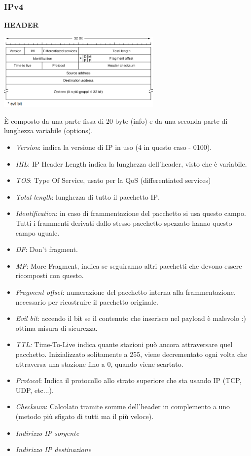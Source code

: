 \documentclass[10pt,a4paper,twoside]{article}
\begin{document}
\subsubsection{IPv4}
\textbf{HEADER}
\begin{center}
\includegraphics[width=0.6\textwidth]{images/header_ipv4.png}
\end{center}
È composto da una parte fissa di 20 byte (info) e da una seconda parte di lunghezza variabile (options).
\begin{itemize}
\item \textit{Version}: indica la versione di IP in uso (4 in questo caso - 0100).
\item \textit{IHL}: IP Header Length indica la lunghezza dell'header, visto che è variabile.
\item \textit{TOS}: Type Of Service, usato per la QoS (differentiated services)
\item \textit{Total length}: lunghezza di tutto il pacchetto IP.
\item \textit{Identification}: in caso di frammentazione del pacchetto si usa questo campo. Tutti i frammenti derivati dallo stesso pacchetto spezzato hanno questo campo uguale.
\item \textit{DF}: Don't fragment.
\item \textit{MF}: More Fragment, indica se seguiranno altri pacchetti che devono essere ricomposti con questo.
\item \textit{Fragment offset}: numerazione del pacchetto interna alla frammentazione, necessario per ricostruire il pacchetto originale.
\item \textit{Evil bit}: accendo il bit se il contenuto che inserisco nel payload è malevolo :) ottima misura di sicurezza.
\item \textit{TTL:} Time-To-Live indica quante stazioni può ancora attraversare quel pacchetto. Inizializzato solitamente a 255, viene decrementato ogni volta che attraversa una stazione fino a 0, quando viene scartato.
\item \textit{Protocol}: Indica il protocollo allo strato superiore che sta usando IP (TCP, UDP, etc...).
\item \textit{Checksum}: Calcolato tramite somme dell'header in complemento a uno (metodo più sfigato di tutti ma il più veloce).
\item \textit{Indirizzo IP sorgente}
\item \textit{Indirizzo IP destinazione}
\end{itemize}
\end{document}

